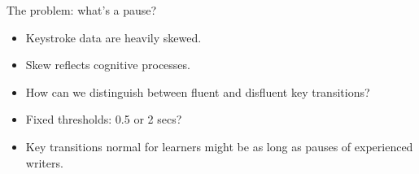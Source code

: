 \begin{frame}{The problem: what's a pause?}
	
	\begin{minipage}{.52\textwidth}
		\begin{small}
			\begin{itemize}
				\item Keystroke data are heavily skewed.
				\item Skew reflects cognitive processes.
				\item How can we distinguish between fluent and disfluent key transitions?
				\item Fixed thresholds: 0.5 or 2 secs?				
				\item Key transitions normal for learners might be as long as pauses of experienced writers.
			\end{itemize}
		\end{small}
	\end{minipage}
	\hfill
	\begin{minipage}{.42\textwidth}	
	\end{minipage}

	
\end{frame}